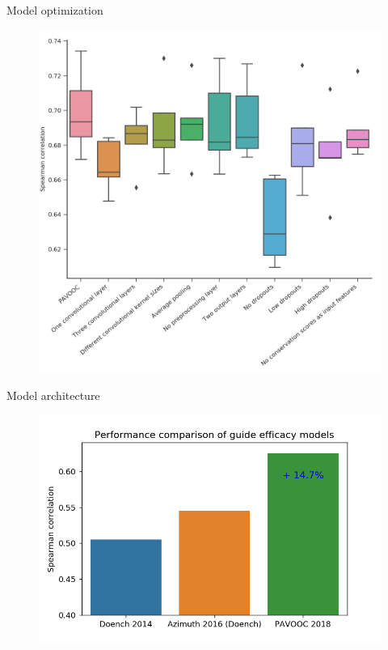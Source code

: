 \documentclass[Nike]{tuberlinbeamer}
\begin{document}
\begin{frame}{Model optimization}
  \vspace{-0.3cm}
  \begin{figure}
    \includegraphics[width=0.57\linewidth]{cnn38_saturation.png}
  \end{figure}

\end{frame}

\begin{frame}{Model architecture}
  \begin{figure}
    \includegraphics[width=0.65\linewidth]{model_comparison2.png}
  \end{figure}
\end{frame}

\end{document}
